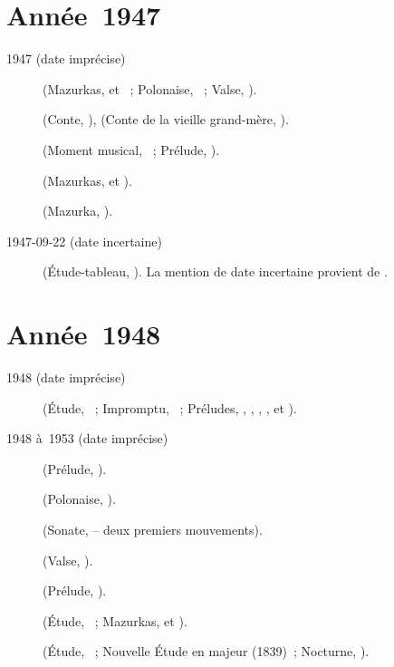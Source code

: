 \section{Année~1947}

\begin{description}
 \item[1947 (date imprécise)]
 \Chopin{} (Mazurkas,   et ~; Polonaise,
 ~; Valse,  ).
 \item[]
 \Medtner{} (Conte,  ), \Prokofiev{} (Conte de la vieille
 grand-mère,  ).
 \item[]
 \Rachmaninov{} (Moment musical,  ~; Prélude, 
 ).
 \item[]
 \Chopin{} (Mazurkas,   et  ).
 \item[]
 \Chopin{} (Mazurka,  ).
 \item[1947-09-22 (date incertaine)]
 \Rachmaninov{} (Étude-tableau,  ).
 La mention de date incertaine provient de \citet[vol.~10]{Nikonovich79}.
\end{description}

\section{Année~1948}

\begin{description}
 \item[1948 (date imprécise)]
 \Scriabine{} (Étude,  ~; Impromptu, 
 ~; Préludes,  ,  , 
 ,  ,   et 
 ).
 \item[1948 à~1953 (date imprécise)]
 \Scriabine{} (Prélude,  ).
 \item[]
 \Chopin{} (Polonaise,  ).
 \item[]
 \Schumann{} (Sonate,  -- deux premiers mouvements).
 \item[]
 \Scriabine{} (Valse, ).
 \item[]
 \Scriabine{} (Prélude,  ).
 \item[]
 \Scriabine{} (Étude,  ~; Mazurkas,  
 et  ).
 \item[]
 \Chopin{} (Étude,  ~; Nouvelle Étude  en \kA
 \Flat majeur (1839)~; Nocturne,  ).
\end{description}

